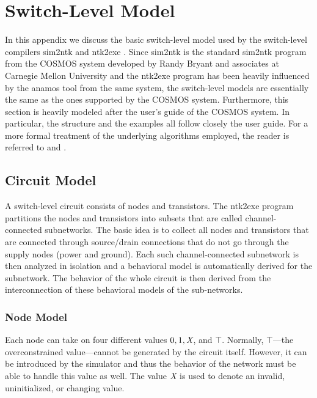\section{Switch-Level Model}

In this appendix we discuss the basic switch-level model%
%
{} used
by the switch-level compilers sim2ntk%
%
{} and ntk2exe%
%
{}.
Since sim2ntk is the standard sim2ntk program from the COSMOS%
%
{}
system developed by Randy Bryant and associates at Carnegie Mellon University
and the ntk2exe program has been heavily influenced by the anamos
tool from the same system, the switch-level models are essentially the
same as the ones supported by the COSMOS system.
Furthermore, this section is heavily modeled after the user's guide
of the COSMOS system.
In particular, the structure and the examples all follow closely the
user guide.
For a more formal treatment of the underlying algorithms employed, the
reader is referred to \cite{bryant-tcad87b} and \cite{seger-imec89}.

\subsection{Circuit Model}

A switch-level circuit consists of nodes and transistors.
The ntk2exe program partitions the nodes and transistors
into subsets that are called channel-connected subnetworks.
The basic idea is to collect all nodes and transistors that are connected
through source/drain connections that do not go through the supply nodes
(power and ground).
Each such channel-connected subnetwork is then analyzed in isolation
and a behavioral model is automatically derived for the subnetwork.
The behavior of the whole circuit is then derived from the interconnection
of these behavioral models of the sub-networks.

\subsubsection{Node Model}

Each node can take on four different values $0,1, \mbox{\em X}$, and $\top$.
Normally, $\top$---the overconstrained value---cannot be generated by
the circuit itself.
However, it can be introduced by the simulator and thus
the behavior of the network must be able to handle this value as well.
The value $\mbox{\em X}$ is used to denote an invalid, uninitialized, or changing value.

